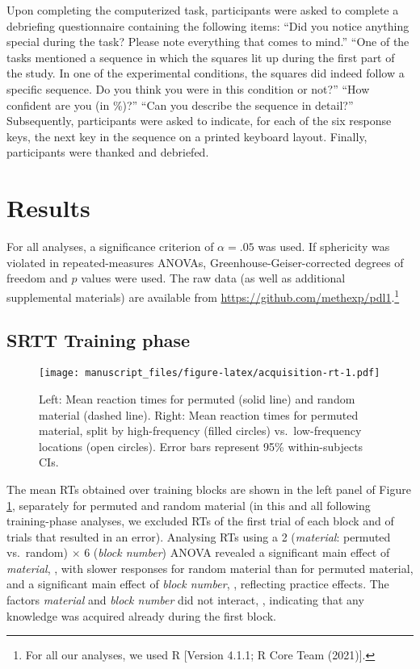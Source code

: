 \documentclass[
  english,
  man]{apa6}
\begin{document}
Upon completing the computerized task, participants were asked to complete a debriefing questionnaire containing the following items:
``Did you notice anything special during the task? Please note everything that comes to mind.''
``One of the tasks mentioned a sequence in which the squares lit up during the first part of the study. In one of the experimental conditions, the squares did indeed follow a specific sequence. Do you think you were in this condition or not?''
``How confident are you (in \%)?'' ``Can you describe the sequence in detail?''
Subsequently, participants were asked to indicate, for each of the six response keys, the next key in the sequence on a printed keyboard layout.
Finally, participants were thanked and debriefed.

\hypertarget{results}{%
\section{Results}\label{results}}

For all analyses, a significance criterion of \(\alpha = .05\) was used.
If sphericity was violated in repeated-measures ANOVAs, Greenhouse-Geiser-corrected degrees of freedom and \(p\) values were used.
The raw data (as well as additional supplemental materials) are available from \url{https://github.com/methexp/pdl1}.\footnote{For all our analyses, we used R {[}Version 4.1.1; R Core Team (2021){]}.}

\hypertarget{srtt-training-phase}{%
\subsection{SRTT Training phase}\label{srtt-training-phase}}



\begin{figure}
\centering
\texttt{[image: manuscript\_files/figure-latex/acquisition-rt-1.pdf]}
\caption{\label{fig:acquisition-rt}Left: Mean reaction times for permuted (solid line) and random material (dashed line). Right: Mean reaction times for permuted material, split by high-frequency (filled circles) vs.~low-frequency locations (open circles). Error bars represent 95\% within-subjects CIs.}
\end{figure}

The mean RTs obtained over training blocks are shown in the left panel of Figure \ref{fig:acquisition-rt}, separately for permuted and random material (in this and all following training-phase analyses, we excluded RTs of the first trial of each block and of trials that resulted in an error).
Analysing RTs using a 2 (\emph{material}: permuted vs.~random) \(\times\) 6 (\emph{block number}) ANOVA revealed a significant main effect of \emph{material}, , with slower responses for random material than for permuted material, and a significant main effect of \emph{block number}, , reflecting practice effects.
The factors \emph{material} and \emph{block number} did not interact, , indicating that any knowledge was acquired already during the first block.
\end{document}
